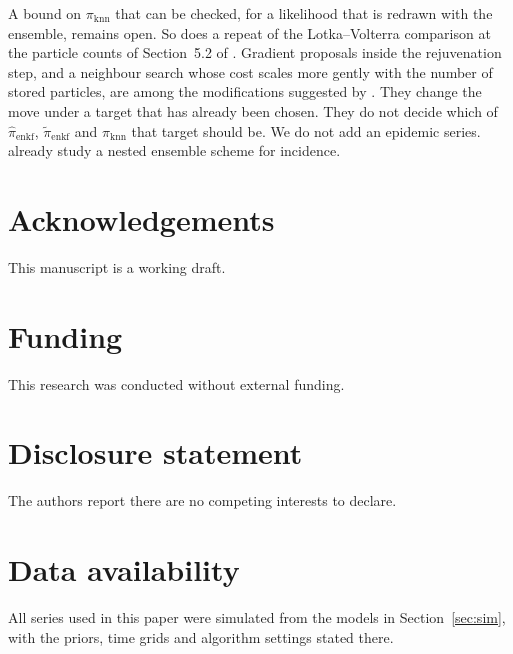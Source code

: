 A bound on \(\pi_{\mathrm{knn}}\) that can be checked, for a likelihood that is redrawn with the ensemble, remains open. So does a repeat of the Lotka--Volterra comparison at the particle counts of Section~5.2 of \citet{golightly2026}. Gradient proposals inside the rejuvenation step, and a neighbour search whose cost scales more gently with the number of stored particles, are among the modifications suggested by \citet{golightly2026}. They change the move under a target that has already been chosen. They do not decide which of \(\hat{\pi}_{\mathrm{enkf}}\), \(\tilde{\pi}_{\mathrm{enkf}}\) and \(\pi_{\mathrm{knn}}\) that target should be. We do not add an epidemic series. \citet{temfack2026} already study a nested ensemble scheme for incidence.

\section*{Acknowledgements}

This manuscript is a working draft.

\section*{Funding}

This research was conducted without external funding.

\section*{Disclosure statement}

The authors report there are no competing interests to declare.

\section*{Data availability}

All series used in this paper were simulated from the models in Section~\ref{sec:sim}, with the priors, time grids and algorithm settings stated there.
